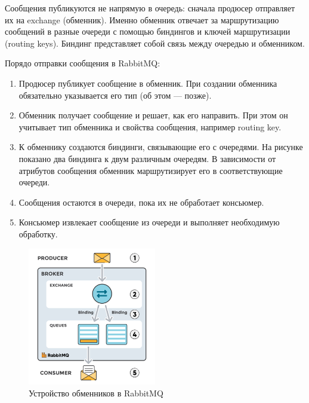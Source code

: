 Сообщения публикуются не напрямую в очередь: сначала продюсер отправляет их на exchange (обменник). Именно обменник отвечает за маршрутизацию сообщений в разные очереди с помощью биндингов и ключей маршрутизации (routing keys). Биндинг представляет собой связь между очередью и обменником.

Порядо отправки сообщения в RabbitMQ:
\begin{enumerate}[label=., leftmargin=3em]
\item Продюсер публикует сообщение в обменник. При создании обменника  обязательно указывается его тип (об этом — позже).
\item Обменник получает сообщение и решает, как его направить. При этом он учитывает тип обменника и свойства сообщения, например routing key.
\item К обменнику создаются биндинги, связывающие его с очередями. На рисунке показано два биндинга к двум различным очередям. В зависимости от атрибутов сообщения обменник маршрутизирует его в соответствующие очереди.
\item Сообщения остаются в очереди, пока их не обработает консьюмер.

\item Консьюмер извлекает сообщение из очереди и выполняет необходимую обработку.
\end{enumerate}

\begin{figure}[h!]
    \centering
    \includegraphics[width=0.5\textwidth]{styles/diploma/inc/rabbitmq2.png} 
    \caption{Устройство обменников в RabbitMQ}
    \label{fig:example}
\end{figure}







